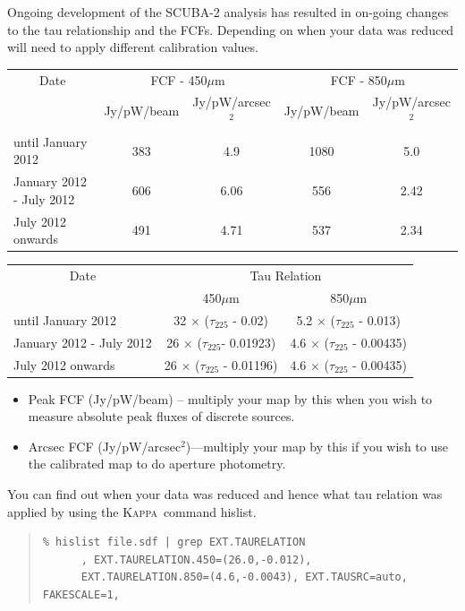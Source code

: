 \documentclass[twoside,11pt]{article}
\newcommand{\xref}[3]{#1}
\renewcommand{\_}{\texttt{\symbol{95}}}
\newenvironment{myquote}{\begin{quote}\begin{small}}{\end{small}\end{quote}}
\newcommand{\Kappa}{\xref{\textsc{Kappa}}{sun95}{}}
\newcommand{\task}[1]{\textsf{#1}}
\newcommand{\hislist}{\xref{\task{hislist}}{sun95}{HISLIST}}
\begin{document}
Ongoing development of the SCUBA-2 analysis has resulted in on-going
changes to the tau relationship and the FCFs. Depending on when your
data was reduced will need to apply different calibration values.
\\
\begin{table}[h!]
\begin{center}
\begin{tabular}{|l|c|c|c|c|}
 \hline
 \multicolumn{1}{|c|}{Date} &
 \multicolumn{2}{c|}{FCF - 450$\mu$m} &
\multicolumn{2}{c|}{FCF - 850$\mu$m} \\
\cline{2-5}
& Jy/pW/beam &Jy/pW/arcsec$^2$ & Jy/pW/beam &Jy/pW/arcsec$^2$ \\
 \hline
until January 2012 &383 & 4.9&1080 &5.0 \\
January 2012 - July 2012&606&6.06 &556 &2.42 \\
July 2012 onwards&491 &4.71 &537 &2.34 \\
\hline
\end{tabular}
\end{center}
\end{table}
\vspace{-2mm}
\begin{table}[h!]
\begin{center}
\begin{tabular}{|l|c|c|}
 \hline
 \multicolumn{1}{|c}{Date} & \multicolumn{2}{|c|}{Tau Relation} \\ \cline{2-3}
                           & 450$\mu$m & 850$\mu$m \\ \hline
until January 2012 & 32 $\times$ ($\tau_{225}$ - 0.02) & 5.2 $\times$ ($\tau_{225}$ - 0.013) \\
January 2012 - July 2012 & 26 $\times$ ($\tau_{225}$- 0.01923) & 4.6 $\times$ ($\tau_{225}$ - 0.00435) \\
July 2012 onwards & 26 $\times$ ($\tau_{225}$ - 0.01196) & 4.6 $\times$ ($\tau_{225}$ - 0.00435) \\
\hline
\end{tabular}
\end{center}
\end{table}

\vspace{-5mm}
\begin{itemize}
\item Peak FCF (Jy/pW/beam) -- multiply your map by this when you wish
to measure absolute peak fluxes of discrete sources.
\item Arcsec FCF (Jy/pW/arcsec$^2$)---multiply your map by this if
you wish to use the calibrated map to do aperture photometry.
\end{itemize}
You can find out when your data was reduced and hence what tau
relation was applied by using the \Kappa\ command \hislist.
\vspace{-2mm}
\begin{myquote}
\begin{verbatim}
% hislist file.sdf | grep EXT.TAURELATION
      , EXT.TAURELATION.450=(26.0,-0.012),
      EXT.TAURELATION.850=(4.6,-0.0043), EXT.TAUSRC=auto, FAKESCALE=1,
\end{verbatim}
\end{myquote}
\end{document}
